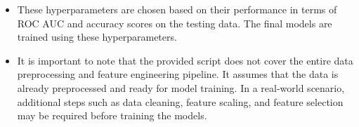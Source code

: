 \documentclass[a4, 10 pt, conference]{ieeeconf}  %
\begin{document}
{\begin{itemize}
\hspace*{0.5cm}Logistic Regression:\newline
\hspace*{1cm}C = 0.1,\\ \hspace*{1cm}class\_weight = \{0: 0.1, 1: 0.9\}\newline
\hspace*{0.5cm}Decision Tree:\newline
\hspace*{1cm}max\_depth = 15,\newline
\hspace*{1cm}class\_weight = 'balanced'\newline
\hspace*{0.5cm}Random Forest:\newline
\hspace*{1cm}n\_estimators = 100,\newline
\hspace*{1cm}max\_features = 'sqrt',\newline
\hspace*{1cm}class\_weight = 'balanced'\newline
\hspace*{0.5cm}Multilayer Perceptron:\newline
\hspace*{1cm}hidden\_layer\_sizes = (50, 50),\newline
\hspace*{1cm}activation = 'relu',\newline
\hspace*{1cm}alpha = 0.0001\newline
\hspace*{0.5cm}AdaBoost:\newline
\hspace*{1cm}n\_estimators = 100,\newline
\hspace*{1cm}estimator =DecisionTreeClassifier(max\_depth=4)

	\item These hyperparameters are chosen based on their performance in terms of ROC AUC and accuracy scores on the testing data. The final models are trained using these hyperparameters.

	\item It is important to note that the provided script does not cover the entire data preprocessing and feature engineering pipeline. It assumes that the data is already preprocessed and ready for model training. In a real-world scenario, additional steps such as data cleaning, feature scaling, and feature selection may be required before training the models. 
\end{itemize}
}
\end{document}
